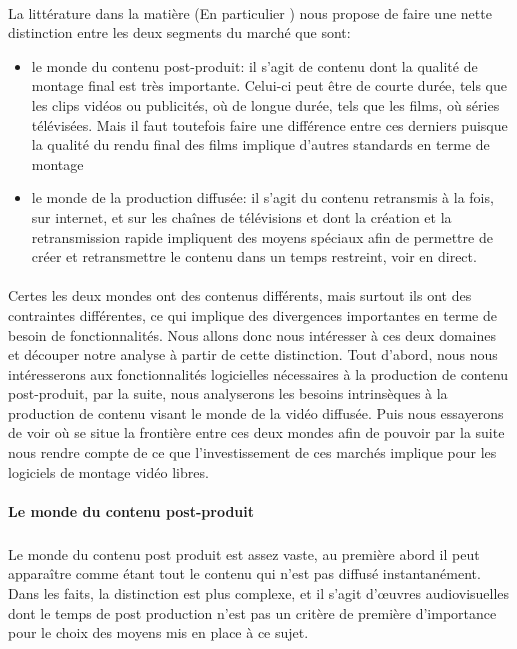 \paragraph{}
La littérature dans la matière (En particulier \cite{WorldVideoNonlinearEditingMarket})
nous propose de faire une nette distinction entre  les deux segments du marché que sont:
\begin{itemize}
  \item {le monde du contenu post-produit: il s'agit de contenu dont la qualité de
    montage final est très importante. Celui-ci peut être de courte durée, tels que les clips
    vidéos ou publicités, où de longue durée, tels que les films, où séries télévisées. Mais
    il faut toutefois faire une différence entre ces derniers puisque la qualité du
    rendu final des films implique d'autres standards en terme de montage}
  \item {le monde de la production diffusée: il s'agit du contenu retransmis à la fois,
    sur internet, et sur les chaînes de télévisions et dont la création et la retransmission
    rapide impliquent des moyens spéciaux afin de permettre de créer et retransmettre
    le contenu dans un temps restreint, voir en direct.}
\end{itemize}

\paragraph{}
Certes les deux mondes ont des contenus différents, mais surtout ils ont des contraintes différentes,
ce qui implique des divergences importantes en terme de besoin de fonctionnalités. Nous allons donc
nous intéresser à ces deux domaines et découper notre analyse à partir de cette distinction. Tout
d'abord, nous nous intéresserons aux fonctionnalités logicielles nécessaires à la production
de contenu post-produit, par la suite, nous analyserons les besoins intrinsèques à la production de contenu
visant le monde de la vidéo diffusée. Puis nous essayerons de voir où se situe la frontière entre ces
deux mondes afin de pouvoir par la suite nous rendre compte de ce que l'investissement de ces marchés
implique pour les logiciels de montage vidéo libres.

\paragraph{Le monde du contenu post-produit}
\subparagraph{}
Le monde du contenu post produit est assez vaste, au première abord il peut apparaître comme étant tout le contenu
qui n'est pas diffusé instantanément. Dans les faits, la distinction est plus complexe, et il s'agit
d'œuvres audiovisuelles dont le temps de post production n'est pas un critère de première d'importance
pour le choix des moyens mis en place à ce sujet.

